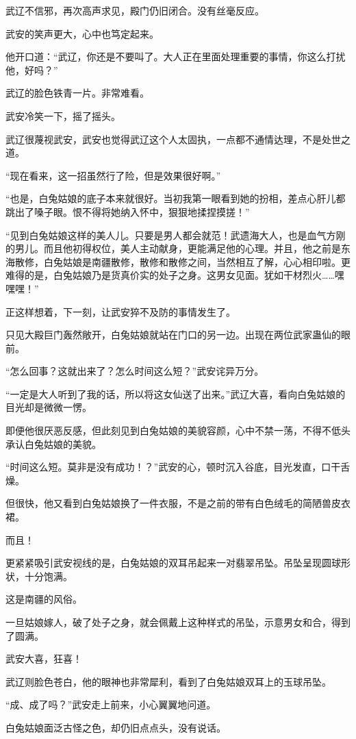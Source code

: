 \begin{this_body}
武辽不信邪，再次高声求见，殿门仍旧闭合。没有丝毫反应。

武安的笑声更大，心中也笃定起来。

他开口道：“武辽，你还是不要叫了。大人正在里面处理重要的事情，你这么打扰他，好吗？”

武辽的脸色铁青一片。非常难看。

武安冷笑一下，摇了摇头。

武辽很蔑视武安，武安也觉得武辽这个人太固执，一点都不通情达理，不是处世之道。

“现在看来，这一招虽然行了险，但是效果很好啊。”

“也是，白兔姑娘的底子本来就很好。当初我第一眼看到她的扮相，差点心肝儿都跳出了嗓子眼。恨不得将她纳入怀中，狠狠地揉捏摸搓！”

“见到白兔姑娘这样的美人儿。只要是男人都会就范！武遗海大人，也是血气方刚的男儿。而且他初得权位，美人主动献身，更能满足他的心理。并且，他之前是东海散修，白兔姑娘是南疆散修，散修和散修之间，当然相互了解，心心相印啦。更难得的是，白兔姑娘乃是货真价实的处子之身。这男女见面。犹如干材烈火……嘿嘿嘿！”

正这样想着，下一刻，让武安猝不及防的事情发生了。

只见大殿巨门轰然敞开，白兔姑娘就站在门口的另一边。出现在两位武家蛊仙的眼前。

“怎么回事？这就出来了？怎么时间这么短？”武安诧异万分。

“一定是大人听到了我的话，所以将这女仙送了出来。”武辽大喜，看向白兔姑娘的目光却是微微一愣。

即便他很厌恶反感，但此刻见到白兔姑娘的美貌容颜，心中不禁一荡，不得不低头承认白兔姑娘的美貌。

“时间这么短。莫非是没有成功！？”武安的心，顿时沉入谷底，目光发直，口干舌燥。

但很快，他又看到白兔姑娘换了一件衣服，不是之前的带有白色绒毛的简陋兽皮衣裙。

而且！

更紧紧吸引武安视线的是，白兔姑娘的双耳吊起来一对翡翠吊坠。吊坠呈现圆球形状，十分饱满。

这是南疆的风俗。

一旦姑娘嫁人，破了处子之身，就会佩戴上这种样式的吊坠，示意男女和合，得到了圆满。

武安大喜，狂喜！

武辽则脸色苍白，他的眼神也非常犀利，看到了白兔姑娘双耳上的玉球吊坠。

“成、成了吗？”武安走上前来，小心翼翼地问道。

白兔姑娘面泛古怪之色，却仍旧点点头，没有说话。


\end{this_body}
